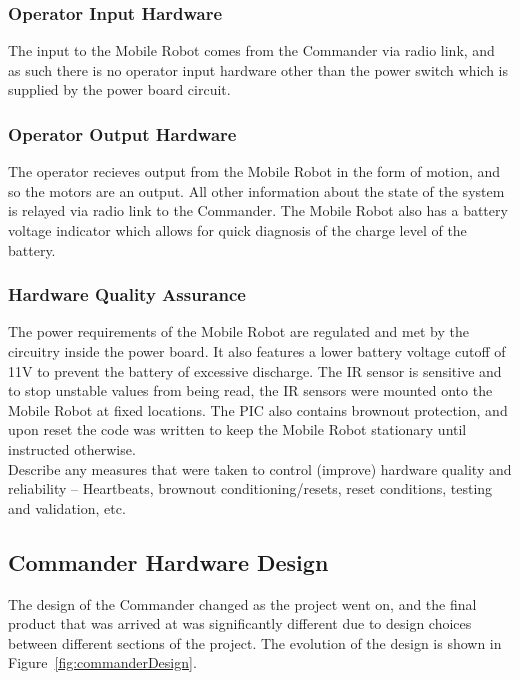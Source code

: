 \documentclass[11pt,a4paper]{article}
\begin{document}
    \subsubsection{Operator Input Hardware}
      The input to the Mobile Robot comes from the Commander via radio link, and as such there is no operator input hardware other than the power switch which is supplied by the power board circuit.
    \subsubsection{Operator Output Hardware}
      The operator recieves output from the Mobile Robot in the form of motion, and so the motors are an output. All other information about the state of the system is relayed via radio link to the Commander. The Mobile Robot also has a battery voltage indicator which allows for quick diagnosis of the charge level of the battery.
    \subsubsection{Hardware Quality Assurance}
      The power requirements of the Mobile Robot are regulated and met by the circuitry inside the power board. It also features a lower battery voltage cutoff of 11V to prevent the battery of excessive discharge. The IR sensor is sensitive and to stop unstable values from being read, the IR sensors were mounted onto the Mobile Robot at fixed locations. The PIC also contains brownout protection, and upon reset the code was written to keep the Mobile Robot stationary until instructed otherwise.\\

    Describe any measures that were taken to control (improve) hardware quality and reliability – Heartbeats, brownout conditioning/resets, reset conditions, testing and validation, etc.

  \subsection{Commander Hardware Design}
    The design of the Commander changed as the project went on, and the final product that was arrived at was significantly different due to design choices between different sections of the project. The evolution of the design is shown in Figure~\ref{fig:commanderDesign}.
\end{document}
